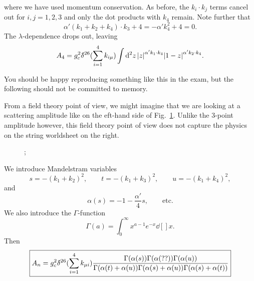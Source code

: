 \begin{description}
\begin{equation}
    \end{equation}
    where we have used momentum conservation. As before, the $k_i \cdot k_j$ terms cancel out for $i, j = 1, 2, 3$ and only the dot products with $k_4$ remain.
    Note further that
    \begin{equation}
      \alpha' (k_1 + k_2 + k_4) \cdot k_3 + 4 = -\alpha' k_4^2 + 4 = 0.
    \end{equation}
    The $\lambda$-dependence drops out, leaving
    \begin{equation}
      A_4 = g_c^2 \delta\hspace*{-0.2em}\bar{}\hspace*{0.2em}^{26}(\sum_{i=1}^{4} k_{i \mu}) \int \dd[2]{z} \abs{z}^{\alpha' k_1 \cdot k_4} \abs{1 - z}^{\alpha' k_2 \cdot k_4}.
    \end{equation}
    \begin{leftbar}
      You should be happy reproducing something like this in the exam, but the following should not be committed to memory.
    \end{leftbar}
    From a field theory point of view, we might imagine that we are looking at a scattering amplitude like on the eft-hand side of Fig.~\ref{fig:l23f2}. Unlike the $3$-point amplitude however, this field theory point of view does not capture the physics on the string worldsheet on the right.
  \begin{figure}[tbhp]
    \centering
    \begin{minipage}[t]{0.5\columnwidth}
      \centering
      ;
      \caption{}
      \label{fig:l23f3}
    \end{minipage}%
    \begin{minipage}[t]{0.5\columnwidth}
      \centering
      \caption{}
      \label{fig:l23f2}
    \end{minipage}
  \end{figure}
  We introduce Mandelstram variables
  \begin{equation}
    s = -(k_1 + k_2)^2, \qquad t = -(k_1 + k_3)^2, \qquad u = -(k_1 + k_4)^2,
  \end{equation}
  and 
  \begin{equation}
    \alpha(s) = -1 - \frac{\alpha'}{4} s, \qquad \text{etc.}
  \end{equation}
  We also introduce the $\Gamma$-function
  \begin{equation}
    \Gamma(a) = \int_0^\infty x^{a - 1} e^{-x} \dd[]{x}.
  \end{equation}
  Then
  \begin{equation}
    \boxed{A_n = g_c^2 \delta\hspace*{-0.2em}\bar{}\hspace*{0.2em}^{26}(\sum_{i=1}^{4} k_{\mu i}) \frac{\Gamma(\alpha(s)) \Gamma(\alpha(??)) \Gamma(\alpha(u))}{\Gamma(\alpha(t) + \alpha(u)) \Gamma(\alpha(s) + \alpha(u) ) \Gamma(\alpha(s) + \alpha(t))}}
  \end{equation}
\end{description}

